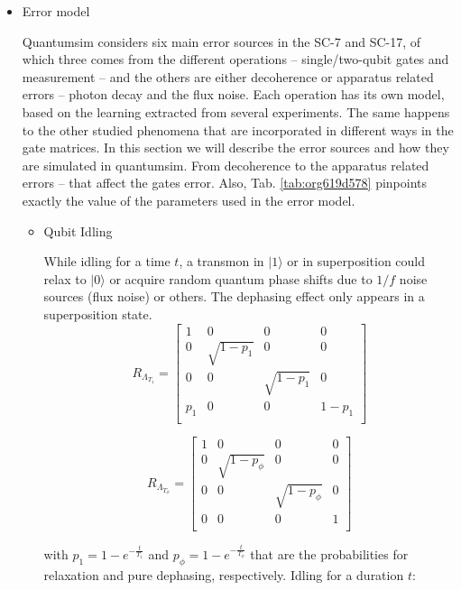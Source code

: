\begin{itemize}
\item Error model
\label{sec:org77012bb}

Quantumsim considers six main error sources in the SC-7 and SC-17, of which three comes from the different operations -- single/two-qubit gates and measurement -- and the others are either decoherence or apparatus related errors -- photon decay and the flux noise.
Each operation has its own model, based on the learning extracted from several experiments.
The same happens to the other studied phenomena that are incorporated in different ways in the gate matrices.
In this section we will describe the error sources and how they are simulated in quantumsim.
From decoherence to the apparatus related errors -- that affect the gates error.
Also, Tab. \ref{tab:org619d578} pinpoints exactly the value of the parameters used in the error model.


\begin{itemize}
\item Qubit Idling
\label{sec:orgbda0d43}

While idling for a time \(t\), a transmon in \(|1\rangle\) or in superposition could relax to \(|0\rangle\) or acquire random quantum phase shifts due to \(1/f\) noise sources (flux noise) or others.
The dephasing effect only appears in a superposition state.
\begin{equation}
\label{eq:org4972471}
R_{\Lambda_{T_1}} = \begin{bmatrix}
 1 & 0 & 0 & 0 \\
 0 & \sqrt{1 - p_1} & 0 & 0 \\
 0 & 0 & \sqrt{1 - p_1} & 0 \\
 p_1 & 0 & 0 & 1 - p_1 \\
\end{bmatrix}
\end{equation}

\begin{equation}
\label{eq:org4b1e8af}
R_{\Lambda_{T_{\phi}}} = \begin{bmatrix}
 1 & 0 & 0 & 0 \\
 0 & \sqrt{1 - p_{\phi}} & 0 & 0 \\
 0 & 0 & \sqrt{1 - p_{\phi}} & 0 \\
 0 & 0 & 0 & 1 \\
\end{bmatrix}
\end{equation}

with \(p_1 = 1 - e^{-\frac{t}{T_1}}\) and \(p_{\phi} = 1 - e^{-\frac{t}{T_{\phi}}}\) that are the probabilities for relaxation and pure dephasing, respectively.
Idling for a duration \(t\):


\end{itemize}
\end{itemize}
